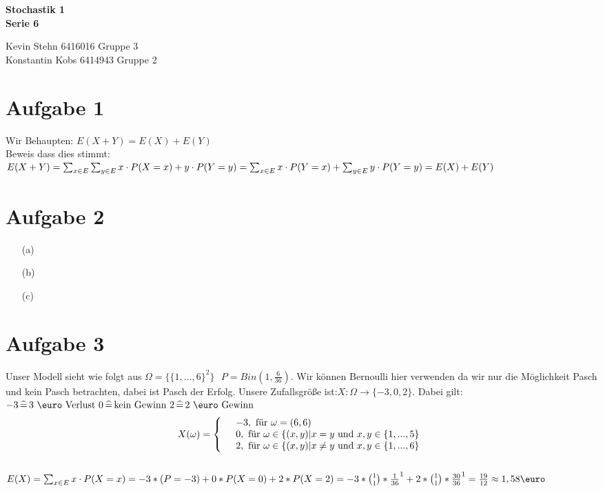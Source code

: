 \documentclass[10pt,a4paper]{article}
\newcommand{\ent}{\mathop{\widehat{=}}}
\begin{document}
\begin{center}
\textbf{Stochastik 1 \\ Serie 6\\}
\end{center}

\begin{flushright}
Kevin Stehn 6416016 Gruppe 3 \\
Konstantin Kobs 6414943 Gruppe 2
\end{flushright}

\section*{Aufgabe 1}
Wir Behaupten: $E(X+Y) = E(X) + E(Y)$\\
Beweis dass dies stimmt:\\
$E(X+Y) = \sum_{x\in E} \sum_{y \in E} x \cdot P(X=x) + y \cdot P(Y=y)\\
\\ = \sum_{x\in E} x \cdot P(Y=x) + \sum_{y \in E} y\cdot P(Y=y) 
\\\\= E(X) + E(Y)$
\section*{Aufgabe 2}
\begin{itemize}
\item[(a)]
\item[(b)]
\item[(c)]
\end{itemize}

\section*{Aufgabe 3}
Unser Modell sieht wie folgt aus $\Omega = \{\{1,...,6\}^2\} \text{ } P = Bin(1,\frac{6}{36})$. Wir k\"onnen Bernoulli hier verwenden da wir nur die M\"oglichkeit Pasch und kein Pasch betrachten, dabei ist Pasch der Erfolg. Unsere Zufallsgröße ist:$X: \Omega \rightarrow \{-3,0,2\}$. Dabei gilt: $-3 \ent \text{3 \euro Verlust} \text{ } 0 \ent \text{kein Gewinn } 2 \ent \text{2 \euro Gewinn}$
\begin{align*}
X(\omega) = \left\{
\begin{array}{l l}
& -3, \text{ f\"ur } \omega = (6,6)  \\ 
& 0 , \text{ f\"ur }  \omega \in \{(x,y)|x=y \text{ und } x,y \in \{1,...,5\}\\
&  2, \text{ f\"ur } \omega \in \{(x,y)|x \neq y \text{ und } x,y \in \{1,...,6\}
\end{array}
\right.
\end{align*} \\
$E(X) = \sum_{x\in E} x\cdot P(X=x) \\
= -3*(P=-3) + 0*P(X=0)+2*P(X=2)\\\\
=-3*\binom{1}{1}*\frac{1}{36}^1+2*\binom{1}{1}*\frac{30}{36}^1\\\\
= \frac{19}{12} \approx 1,58\text{\euro}$
\end{document}
